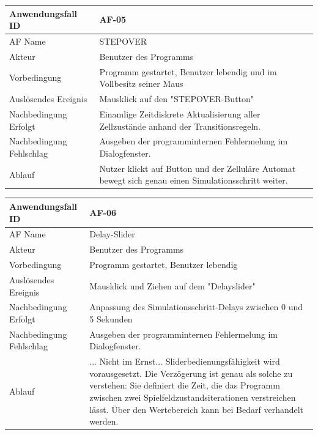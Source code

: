 \documentclass[11pt,a4paper]{article}
\begin{document}
\begin{tabular}[m]{|m{7cm}|m{9cm}|}
    \hline
    Anwendungsfall ID     & AF-05 \\
         \hline
    AF Name     &  STEPOVER \\
         \hline
    Akteur&Benutzer des Programms \\
    \hline
    Vorbedingung&Programm gestartet, Benutzer lebendig und im Vollbesitz seiner Maus\\
    \hline
    Auslösendes Ereignis&Mausklick auf den "STEPOVER-Button"\\
    \hline
    Nachbedingung Erfolgt& Einamlige Zeitdiskrete Aktualisierung aller Zellzustände anhand der Transitionsregeln.\\
    \hline
    Nachbedingung Fehlschlag&Ausgeben der programminternen Fehlermelung im Dialogfenster.\\
    \hline
    Ablauf&Nutzer klickt auf Button und der Zelluläre Automat bewegt sich genau einen Simulationsschritt weiter.\\
    \hline
\end{tabular}
\par


\begin{tabular}[m]{|m{7cm}|m{9cm}|}
    \hline
    Anwendungsfall ID     & AF-06 \\
         \hline
    AF Name     &  Delay-Slider\\
         \hline
    Akteur&Benutzer des Programms \\
    \hline
    Vorbedingung&Programm gestartet, Benutzer lebendig\\
    \hline
    Auslösendes Ereignis& Mausklick und Ziehen auf dem "Delayslider"\\
    \hline
    Nachbedingung Erfolgt&Anpassung des Simulationsschritt-Delays zwischen 0 und 5 Sekunden\\
    \hline
    Nachbedingung Fehlschlag& Ausgeben der programminternen Fehlermelung im Dialogfenster.\\
    \hline
    Ablauf&... Nicht im Ernst... Sliderbedienungsfähigkeit wird vorausgesetzt. \newline Die Verzögerung ist genau als solche zu verstehen: Sie definiert die Zeit, die das Programm zwischen zwei Spielfeldzustandsiterationen verstreichen lässt. Über den Wertebereich kann bei Bedarf verhandelt werden.
    \\
    \hline
\end{tabular}
\par
\end{document}
